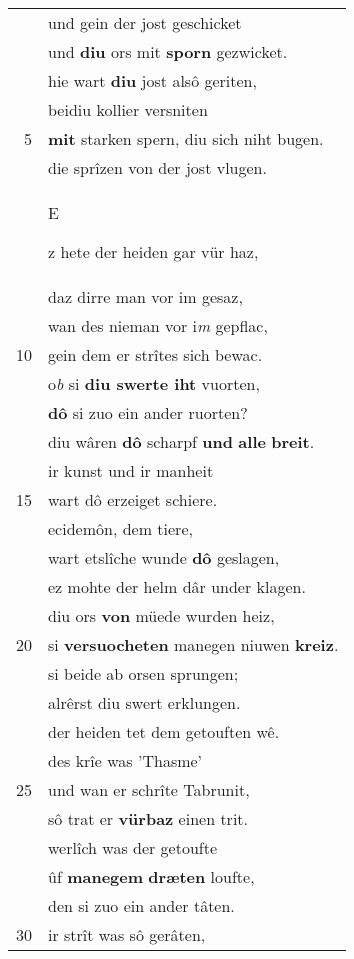 \documentclass[8pt,a4paper,notitlepage]{article}
\begin{document}
\begin{table}[ht]
\begin{minipage}[t]{0.5\linewidth}
\begin{tabular}{rl}
 & und gein der jost geschicket\\ 
 & und \textbf{diu} ors mit \textbf{sporn} gezwicket.\\ 
 & hie wart \textbf{diu} jost alsô geriten,\\ 
 & beidiu kollier versniten\\ 
5 & \textbf{mit} starken spern, diu sich niht bugen.\\ 
 & die sprîzen von der jost vlugen.\\ 
 & \begin{large}E\end{large}z hete der heiden gar vür haz,\\ 
 & daz dirre man vor im gesaz,\\ 
 & wan des nieman vor i\textit{m} gepflac,\\ 
10 & gein dem er strîtes sich bewac.\\ 
 & o\textit{b} si \textbf{diu swerte iht} vuorten,\\ 
 & \textbf{dô} si zuo ein ander ruorten?\\ 
 & diu wâren \textbf{dô} scharpf \textbf{und} \textbf{alle} \textbf{breit}.\\ 
 & ir kunst und ir manheit\\ 
15 & wart dô erzeiget schiere.\\ 
 & ecidemôn, dem tiere,\\ 
 & wart etslîche wunde \textbf{dô} geslagen,\\ 
 & ez mohte der helm dâr under klagen.\\ 
 & diu ors \textbf{von} müede wurden heiz,\\ 
20 & si \textbf{versuocheten} manegen niuwen \textbf{kreiz}.\\ 
 & si beide ab orsen sprungen;\\ 
 & alrêrst diu swert erklungen.\\ 
 & der heiden tet dem getouften wê.\\ 
 & des krîe was 'Thasme'\\ 
25 & und wan er schrîte Tabrunit,\\ 
 & sô trat er \textbf{vürbaz} einen trit.\\ 
 & werlîch was der getoufte\\ 
 & ûf \textbf{manegem} \textbf{dræten} loufte,\\ 
 & den si zuo ein ander tâten.\\ 
30 & ir strît was sô gerâten,\\ 
\end{tabular}

\end{minipage}
\end{table}
\end{document}
